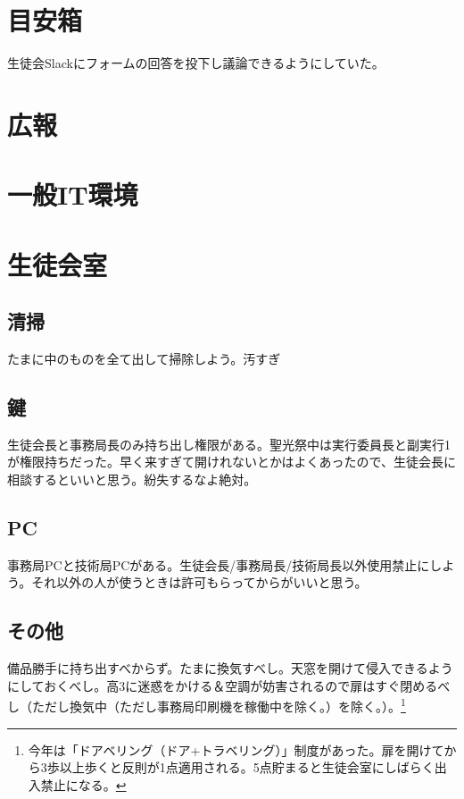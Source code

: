 \documentclass[dvipdfmx,jb5]{jreport}
\begin{document}
\section{目安箱}
生徒会Slackにフォームの回答を投下し議論できるようにしていた。
\section{広報}
\section{一般IT環境}
\section{生徒会室}
\subsection{清掃}
たまに中のものを全て出して掃除しよう。汚すぎ
\subsection{鍵}
生徒会長と事務局長のみ持ち出し権限がある。聖光祭中は実行委員長と副実行1が権限持ちだった。早く来すぎて開けれないとかはよくあったので、生徒会長に相談するといいと思う。紛失するなよ絶対。
\subsection{PC}
事務局PCと技術局PCがある。生徒会長/事務局長/技術局長以外使用禁止にしよう。それ以外の人が使うときは許可もらってからがいいと思う。
\subsection{その他}
備品勝手に持ち出すべからず。たまに換気すべし。天窓を開けて侵入できるようにしておくべし。高3に迷惑をかける＆空調が妨害されるので扉はすぐ閉めるべし（ただし換気中（ただし事務局印刷機を稼働中を除く。）を除く。）。\footnote{今年は「ドアベリング（ドア+トラベリング）」制度があった。扉を開けてから3歩以上歩くと反則が1点適用される。5点貯まると生徒会室にしばらく出入禁止になる。}
\end{document}
